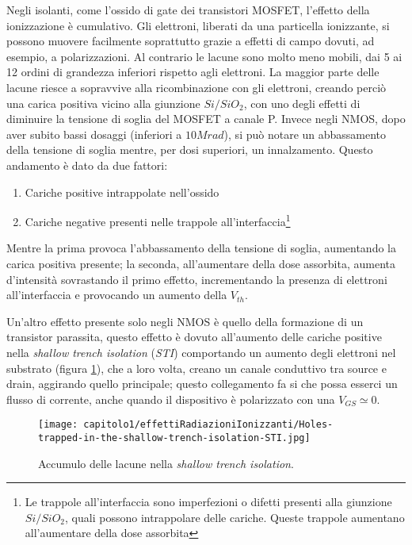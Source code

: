 Negli isolanti, come l'ossido di gate dei transistori MOSFET, l'effetto della ionizzazione è cumulativo. Gli elettroni, liberati da una particella ionizzante, si possono muovere facilmente soprattutto grazie a effetti di campo dovuti, ad esempio, a polarizzazioni.
Al contrario le lacune sono molto meno mobili, dai 5 ai 12 ordini di grandezza inferiori rispetto agli elettroni. La maggior parte delle lacune riesce a sopravvive alla ricombinazione con gli elettroni, creando perciò una carica positiva vicino alla giunzione $Si/SiO_2$, con uno degli effetti di diminuire la tensione di soglia del MOSFET a canale P. Invece negli NMOS, dopo aver subito bassi dosaggi (inferiori a $10Mrad$), si può notare un abbassamento della tensione di soglia mentre, per dosi superiori, un innalzamento. Questo andamento è dato da due fattori:
\begin{enumerate}
	\item Cariche positive intrappolate nell'ossido
	\item Cariche negative presenti nelle trappole all'interfaccia\footnote{Le trappole all'interfaccia sono imperfezioni o difetti presenti alla giunzione $Si/SiO_2$, quali possono intrappolare delle cariche. Queste trappole aumentano all'aumentare della dose assorbita}
\end{enumerate}
Mentre la prima provoca l'abbassamento della tensione di soglia, aumentando la carica positiva presente; la seconda, all'aumentare della dose assorbita, aumenta d'intensità sovrastando il primo effetto, incrementando la presenza di elettroni all'interfaccia e provocando un aumento della $V_{th}$.  

\vspace{0.5cm}

Un'altro effetto presente solo negli NMOS è quello della formazione di un transistor parassita\cite{effetti_radiazioni:CMOS_IC_radiation_hardening_by_design}, questo effetto è dovuto all'aumento delle cariche positive nella \textit{shallow trench isolation} (\textit{STI}) comportando un aumento degli elettroni nel substrato (figura \ref{fig:accumulo_lacune_STI}), che a loro volta, creano un canale conduttivo tra source e drain, aggirando quello principale; questo collegamento fa si che possa esserci un flusso di corrente, anche quando il dispositivo è polarizzato con una $V_{GS} \simeq 0$.

\begin{figure}[ht]
	\centering

	\texttt{[image: capitolo1/effettiRadiazioniIonizzanti/Holes-trapped-in-the-shallow-trench-isolation-STI.jpg]}

	\caption[Lacune nella \textit{STI}]{Accumulo delle lacune nella \textit{shallow trench isolation}\cite{effetti_radiazioni:CMOS_IC_radiation_hardening_by_design}.}
	\label{fig:accumulo_lacune_STI}

\end{figure}


